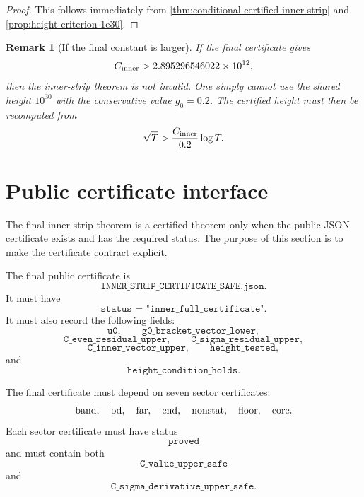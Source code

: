 \documentclass[11pt]{article}
\newtheorem{remark}[theorem]{Remark}
\newcommand{\gev}{g_0}
\newcommand{\Cinner}{C_{\rm inner}}
\begin{document}
\begin{proof}
This follows immediately from
\cref{thm:conditional-certified-inner-strip} and
\cref{prop:height-criterion-1e30}.
\end{proof}

\begin{remark}[If the final constant is larger]
If the final certificate gives
\[
        \Cinner>2.895296546022\times10^{12},
\]
then the inner-strip theorem is not invalid.  One simply cannot use the shared
height \(10^{30}\) with the conservative value \(\gev=0.2\).  The certified
height must then be recomputed from
\[
        \sqrt T
        >
        \frac{\Cinner}{0.2}
        \log T.
\]
\end{remark}


\section{Public certificate interface}
\label{sec:public-certificate-interface}

The final inner-strip theorem is a certified theorem only when the public JSON
certificate exists and has the required status.  The purpose of this section is
to make the certificate contract explicit.

The final public certificate is
\[
        \texttt{INNER\_STRIP\_CERTIFICATE\_SAFE.json}.
\]
It must have
\[
        \texttt{status = "inner\_full\_certificate"}.
\]
It must also record the following fields:
\[
        \texttt{u0},
        \qquad
        \texttt{g0\_bracket\_vector\_lower},
\]
\[
        \texttt{C\_even\_residual\_upper},
        \qquad
        \texttt{C\_sigma\_residual\_upper},
\]
\[
        \texttt{C\_inner\_vector\_upper},
        \qquad
        \texttt{height\_tested},
\]
and
\[
        \texttt{height\_condition\_holds}.
\]

The final certificate must depend on seven sector certificates:
\[
        {\rm band},
        \quad
        {\rm bd},
        \quad
        {\rm far},
        \quad
        {\rm end},
        \quad
        {\rm nonstat},
        \quad
        {\rm floor},
        \quad
        {\rm core}.
\]
Each sector certificate must have status
\[
        \texttt{proved}
\]
and must contain both
\[
        \texttt{C\_value\_upper\_safe}
\]
and
\[
        \texttt{C\_sigma\_derivative\_upper\_safe}.
\]
\end{document}
